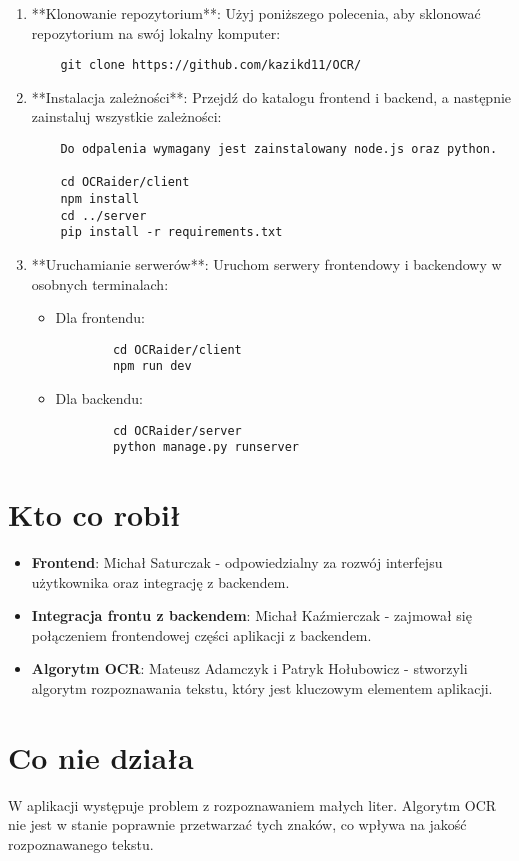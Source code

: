 \documentclass{article}
\begin{document}
\begin{enumerate}
    \item **Klonowanie repozytorium**: Użyj poniższego polecenia, aby sklonować repozytorium na swój lokalny komputer:
    \begin{verbatim}
    git clone https://github.com/kazikd11/OCR/
    \end{verbatim}
    
    \item **Instalacja zależności**: Przejdź do katalogu frontend i backend, a następnie zainstaluj wszystkie zależności:
    \begin{verbatim}
    Do odpalenia wymagany jest zainstalowany node.js oraz python.

    cd OCRaider/client
    npm install
    cd ../server
    pip install -r requirements.txt
    \end{verbatim}
    
    \item **Uruchamianie serwerów**: Uruchom serwery frontendowy i backendowy w osobnych terminalach:
    \begin{itemize}
        \item Dla frontendu:
        \begin{verbatim}
        cd OCRaider/client
        npm run dev
        \end{verbatim}
        
        \item Dla backendu:
        \begin{verbatim}
        cd OCRaider/server
        python manage.py runserver
        \end{verbatim}
    \end{itemize}
\end{enumerate}

\section{Kto co robił}
\begin{itemize}
    \item \textbf{Frontend}: Michał Saturczak - odpowiedzialny za rozwój interfejsu użytkownika oraz integrację z backendem.
    \item \textbf{Integracja frontu z backendem}: Michał Kaźmierczak - zajmował się połączeniem frontendowej części aplikacji z backendem.
    \item \textbf{Algorytm OCR}: Mateusz Adamczyk i Patryk Hołubowicz - stworzyli algorytm rozpoznawania tekstu, który jest kluczowym elementem aplikacji.
\end{itemize}

\section{Co nie działa}
W aplikacji występuje problem z rozpoznawaniem małych liter. Algorytm OCR nie jest w stanie poprawnie przetwarzać tych znaków, co wpływa na jakość rozpoznawanego tekstu.
\end{document}
